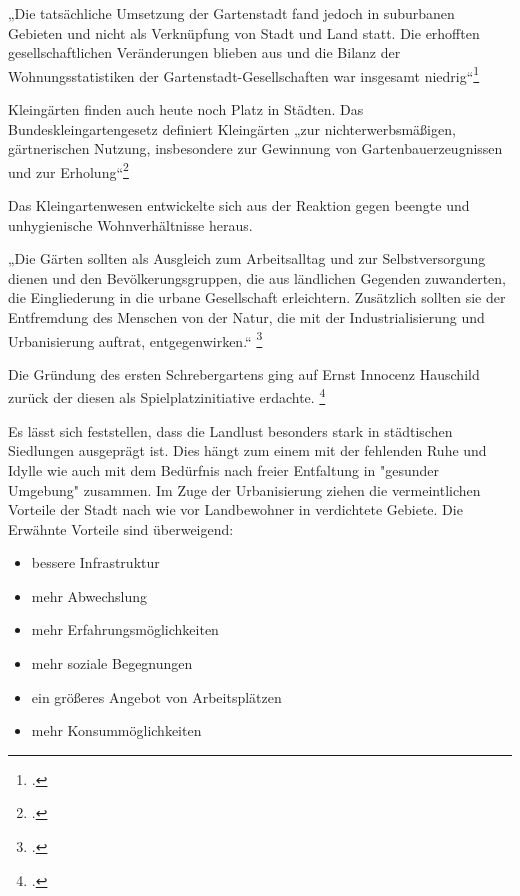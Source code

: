 \documentclass{scrartcl}
\begin{document}
\begin{displayquote}
„Die tatsächliche Umsetzung der Gartenstadt fand jedoch in suburbanen Gebieten und nicht als Verknüpfung von Stadt und Land statt. Die erhofften gesellschaftlichen Veränderungen blieben aus und die Bilanz der Wohnungsstatistiken der Gartenstadt-Gesellschaften war insgesamt niedrig“\footcite[S. 36]{Egnolff2015DieIdeal} 
\end{displayquote}


Kleingärten finden auch heute noch Platz in Städten. Das Bundeskleingartengesetz definiert Kleingärten „zur nichterwerbsmäßigen, gärtnerischen Nutzung, insbesondere zur Gewinnung von Gartenbauerzeugnissen und zur Erholung“\footcite[§ 1]{Verbraucherschutz2006BundeskleingartengesetzBKleingG}

Das Kleingartenwesen entwickelte sich aus der Reaktion gegen beengte und unhygienische Wohnverhältnisse heraus. 

\begin{displayquote}
„Die Gärten sollten als Ausgleich zum Arbeitsalltag und zur Selbstversorgung dienen und den Bevölkerungsgruppen, die aus ländlichen Gegenden zuwanderten, die Eingliederung in die urbane Gesellschaft erleichtern. Zusätzlich sollten sie der Entfremdung des Menschen von der Natur, die mit der Industrialisierung
und Urbanisierung auftrat, entgegenwirken.“ \footcite[Vgl.][S. 38]{Egnolff2015DieIdeal}
\end{displayquote} 

Die Gründung des ersten Schrebergartens ging auf Ernst Innocenz Hauschild zurück der diesen als Spielplatzinitiative erdachte. \footcite[Vgl.][S. 39]{Egnolff2015DieIdeal}


Es lässt sich feststellen, dass die Landlust besonders stark in städtischen Siedlungen ausgeprägt ist. Dies hängt zum einem mit der fehlenden Ruhe und Idylle wie auch mit dem Bedürfnis nach freier Entfaltung in "gesunder Umgebung" zusammen. Im Zuge der Urbanisierung ziehen die vermeintlichen Vorteile der Stadt nach wie vor Landbewohner in verdichtete Gebiete. Die Erwähnte Vorteile sind überweigend: 

\begin{itemize}
\item bessere Infrastruktur
\item mehr Abwechslung
\item mehr Erfahrungsmöglichkeiten 
\item mehr soziale Begegnungen
\item ein größeres Angebot von Arbeitsplätzen
\item mehr Konsummöglichkeiten
\end{itemize}
\end{document}
